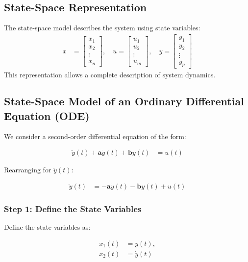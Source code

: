 \documentclass{article}
\begin{document}
\subsection{State-Space Representation}
The state-space model describes the system using state variables:
\begin{align*}
      x & = \begin{bmatrix} x_1 \\ x_2 \\ \vdots \\ x_n \end{bmatrix},
      \quad u = \begin{bmatrix} u_1 \\ u_2 \\ \vdots \\ u_m \end{bmatrix},
      \quad y = \begin{bmatrix} y_1 \\ y_2 \\ \vdots \\ y_p \end{bmatrix}
\end{align*}
This representation allows a complete description of system dynamics.

\subsection{State-Space Model of an Ordinary Differential Equation (ODE)}

We consider a second-order differential equation of the form:

\begin{align*}
      \ddot{y}(t) + \mathbf{a} \dot{y}(t) + \mathbf{b} y(t) &= u(t)
\end{align*}

Rearranging for \( \ddot{y}(t) \):



\begin{align*}
      \ddot{y}(t) &= -\mathbf{a} \dot{y}(t) - \mathbf{b} y(t) + u(t)
\end{align*}

\subsubsection{Step 1: Define the State Variables}

Define the state variables as:

\begin{align*}
      x_1(t) &= y(t), \\
      x_2(t) &= \dot{y}(t)
\end{align*}
\end{document}
